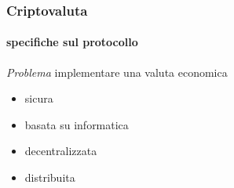 \begin{frame}

	\frametitle{Criptovaluta}
	\framesubtitle{specifiche sul protocollo}
	
	\textit{Problema}
	\newline implementare una {\color{blue}valuta} economica
	\begin{itemize}
	  \item sicura
	  \item basata su informatica
	  \item decentralizzata %
	  \item distribuita %
	\end{itemize}

\end{frame}
